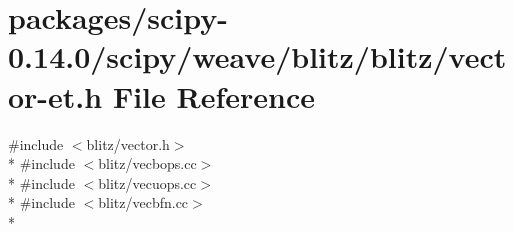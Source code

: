\hypertarget{vector-et_8h}{}\section{packages/scipy-\/0.14.0/scipy/weave/blitz/blitz/vector-\/et.h File Reference}
\label{vector-et_8h}
{\ttfamily \#include $<$blitz/vector.\+h$>$}\\*
{\ttfamily \#include $<$blitz/vecbops.\+cc$>$}\\*
{\ttfamily \#include $<$blitz/vecuops.\+cc$>$}\\*
{\ttfamily \#include $<$blitz/vecbfn.\+cc$>$}\\*
